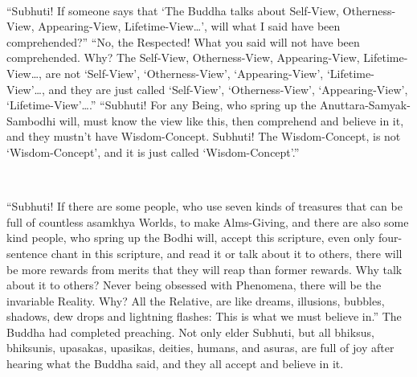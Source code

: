 \documentclass[a5paper,12pt]{book}
\begin{document}
    ~

     ``Subhuti! If someone says that `The Buddha talks about Self-View, Otherness-View, Appearing-View, Lifetime-View\dots{}', will what I said have been comprehended?'' ``No, the Respected! What you said will not have been comprehended. Why? The Self-View, Otherness-View, Appearing-View, Lifetime-View\dots{}, are not `Self-View', `Otherness-View', `Appearing-View', `Lifetime-View'\dots{}, and they are just called `Self-View', `Otherness-View', `Appearing-View', `Lifetime-View'\dots{}.'' ``Subhuti! For any Being, who spring up the Anuttara-Samyak-Sambodhi will, must know the view like this, then comprehend and believe in it, and they mustn't have Wisdom-Concept. Subhuti! The Wisdom-Concept, is not `Wisdom-Concept', and it is just called `Wisdom-Concept'.''

    ~

     ``Subhuti! If there are some people, who use seven kinds of treasures that can be full of countless asamkhya Worlds, to make Alms-Giving, and there are also some kind people, who spring up the Bodhi will, accept this scripture, even only four-sentence chant in this scripture, and read it or talk about it to others, there will be more rewards from merits that they will reap than former rewards. Why talk about it to others? Never being obsessed with Phenomena, there will be the invariable Reality. Why? All the Relative, are like dreams, illusions, bubbles, shadows, dew drops and lightning flashes: This is what we must believe in.'' The Buddha had completed preaching. Not only elder Subhuti, but all bhiksus, bhiksunis, upasakas, upasikas, deities, humans, and asuras, are full of joy after hearing what the Buddha said, and they all accept and believe in it.
\end{document}
